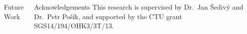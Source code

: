 \documentclass[xcolor=table]{beamer}
\begin{document}
\begin{frame}[fragile]{}
\begin{columns}[t]
\begin{block}{Future Work}
\begin{multicols}{3}
      \end{multicols}
    \end{block}

    \begin{block}{Acknowledgements}
      This research is supervised by Dr.\ Jan Šedivý and Dr.\ Petr Pošík, %
      and supported by the CTU grant SGS14/194/OHK3/3T/13.
    \end{block}

  \end{columns}

\end{frame}
\end{document}
